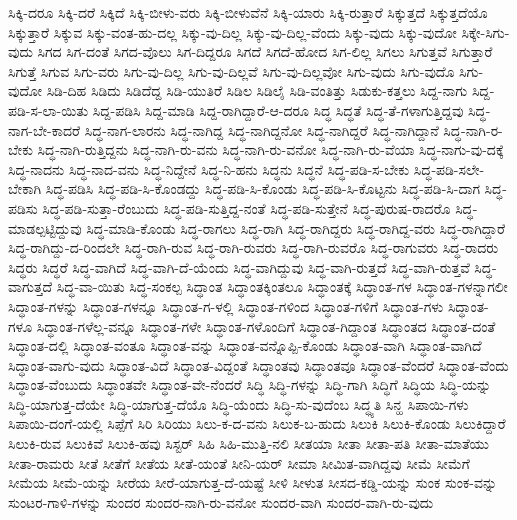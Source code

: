 ಸಿಕ್ಕಿ-ದರೂ
ಸಿಕ್ಕಿ-ದರೆ
ಸಿಕ್ಕಿದೆ
ಸಿಕ್ಕಿ-ಬೀಳು-ವರು
ಸಿಕ್ಕಿ-ಬೀಳುವೆನೆ
ಸಿಕ್ಕಿ-ಯಾರು
ಸಿಕ್ಕಿ-ರುತ್ತಾರೆ
ಸಿಕ್ಕುತ್ತದೆ
ಸಿಕ್ಕುತ್ತದೆಯೊ
ಸಿಕ್ಕುತ್ತಾರೆ
ಸಿಕ್ಕುವ
ಸಿಕ್ಕು-ವಂತ-ಹು-ದಲ್ಲ
ಸಿಕ್ಕು-ವು-ದಿಲ್ಲ
ಸಿಕ್ಕು-ವು-ದಿಲ್ಲ-ವೆಂದು
ಸಿಕ್ಕು-ವುದು
ಸಿಕ್ಕು-ವುದೋ
ಸಿಕ್ಕೇ-ಸಿಗು-ವುದು
ಸಿಗದ
ಸಿಗ-ದಂತೆ
ಸಿಗದ-ವೊಲು
ಸಿಗ-ದಿದ್ದರೂ
ಸಿಗದೆ
ಸಿಗದೆ-ಹೋದ
ಸಿಗ-ಲಿಲ್ಲ
ಸಿಗಲು
ಸಿಗುತ್ತವೆ
ಸಿಗುತ್ತಾರೆ
ಸಿಗುತ್ತೆ
ಸಿಗುವ
ಸಿಗು-ವರು
ಸಿಗು-ವು-ದಿಲ್ಲ
ಸಿಗು-ವು-ದಿಲ್ಲವೆ
ಸಿಗು-ವು-ದಿಲ್ಲವೋ
ಸಿಗು-ವುದು
ಸಿಗು-ವುದೊ
ಸಿಗು-ವುದೋ
ಸಿಡಿ-ದಿಹ
ಸಿಡಿದು
ಸಿಡಿದೆದ್ದ
ಸಿಡಿ-ಯುತಿರೆ
ಸಿಡಿಲ
ಸಿಡಿಲೈ
ಸಿಡಿ-ವಂತಿತ್ತು
ಸಿಡುಕು-ಕತ್ತಲು
ಸಿದ್ದ-ನಾಗು
ಸಿದ್ದ-ಪಡಿ-ಸ-ಲಾ-ಯಿತು
ಸಿದ್ದ-ಪಡಿಸಿ
ಸಿದ್ದ-ಮಾಡಿ
ಸಿದ್ದ-ರಾಗಿದ್ದಾರೆ-ಆ-ದರೂ
ಸಿದ್ಧ
ಸಿದ್ಧತೆ
ಸಿದ್ಧ-ತೆ-ಗಳಾಗುತ್ತಿದ್ದವು
ಸಿದ್ಧ-ನಾಗ-ಬೇ-ಕಾದರೆ
ಸಿದ್ಧ-ನಾಗ-ಲಾರನು
ಸಿದ್ಧ-ನಾಗಿದ್ದ
ಸಿದ್ಧ-ನಾಗಿದ್ದನೋ
ಸಿದ್ಧ-ನಾಗಿದ್ದರೆ
ಸಿದ್ಧ-ನಾಗಿದ್ದಾನೆ
ಸಿದ್ಧ-ನಾಗಿ-ರ-ಬೇಕು
ಸಿದ್ಧ-ನಾಗಿ-ರುತ್ತಿದ್ದನು
ಸಿದ್ಧ-ನಾಗಿ-ರು-ವನು
ಸಿದ್ಧ-ನಾಗಿ-ರು-ವನೋ
ಸಿದ್ಧ-ನಾಗಿ-ರು-ವೆಯಾ
ಸಿದ್ಧ-ನಾಗು-ವು-ದಕ್ಕೆ
ಸಿದ್ಧ-ನಾದನು
ಸಿದ್ಧ-ನಾದ-ವನು
ಸಿದ್ಧ-ನಿದ್ದೇನೆ
ಸಿದ್ಧ-ನಿ-ಹನು
ಸಿದ್ಧನು
ಸಿದ್ಧನೆ
ಸಿದ್ಧ-ಪಡಿ-ಸ-ಬೇಕು
ಸಿದ್ಧ-ಪಡಿ-ಸಲೇ-ಬೇಕಾಗಿ
ಸಿದ್ಧ-ಪಡಿಸಿ
ಸಿದ್ಧ-ಪಡಿ-ಸಿ-ಕೊಂಡದ್ದು
ಸಿದ್ಧ-ಪಡಿ-ಸಿ-ಕೊಂಡು
ಸಿದ್ಧ-ಪಡಿ-ಸಿ-ಕೊಟ್ಟನು
ಸಿದ್ಧ-ಪಡಿ-ಸಿ-ದಾಗ
ಸಿದ್ಧ-ಪಡಿಸು
ಸಿದ್ಧ-ಪಡಿ-ಸುತ್ತಾ-ರೆಂಬುದು
ಸಿದ್ಧ-ಪಡಿ-ಸುತ್ತಿದ್ದ-ನಂತೆ
ಸಿದ್ಧ-ಪಡಿ-ಸುತ್ತೇನೆ
ಸಿದ್ಧ-ಪುರುಷ-ರಾದರೊ
ಸಿದ್ಧ-ಮಾಡಲ್ಪಟ್ಟಿದ್ದುವು
ಸಿದ್ಧ-ಮಾಡಿ-ಕೊಂಡು
ಸಿದ್ಧ-ರಾಗಲು
ಸಿದ್ಧ-ರಾಗಿ
ಸಿದ್ಧ-ರಾಗಿದ್ದರು
ಸಿದ್ಧ-ರಾಗಿದ್ದ-ವರು
ಸಿದ್ಧ-ರಾಗಿದ್ದಾರೆ
ಸಿದ್ಧ-ರಾಗಿದ್ದು-ದ-ರಿಂದಲೇ
ಸಿದ್ಧ-ರಾಗಿ-ರುವ
ಸಿದ್ಧ-ರಾಗಿ-ರುವರು
ಸಿದ್ಧ-ರಾಗಿ-ರುವರೊ
ಸಿದ್ಧ-ರಾಗುವರು
ಸಿದ್ಧ-ರಾದರು
ಸಿದ್ಧರು
ಸಿದ್ಧರೆ
ಸಿದ್ಧ-ವಾಗಿದೆ
ಸಿದ್ಧ-ವಾಗಿ-ದೆ-ಯೆಂದು
ಸಿದ್ಧ-ವಾಗಿದ್ದುವು
ಸಿದ್ಧ-ವಾಗಿ-ರುತ್ತದೆ
ಸಿದ್ಧ-ವಾಗಿ-ರುತ್ತವೆ
ಸಿದ್ಧ-ವಾಗುತ್ತದೆ
ಸಿದ್ಧ-ವಾ-ಯಿತು
ಸಿದ್ಧ-ಸಂಕಲ್ಪ
ಸಿದ್ಧಾಂತ
ಸಿದ್ಧಾಂತಕ್ಕಿಂತಲೂ
ಸಿದ್ಧಾಂತಕ್ಕೆ
ಸಿದ್ಧಾಂತ-ಗಳ
ಸಿದ್ಧಾಂತ-ಗಳನ್ನಾಗಲೀ
ಸಿದ್ಧಾಂತ-ಗಳನ್ನು
ಸಿದ್ಧಾಂತ-ಗಳನ್ನೂ
ಸಿದ್ಧಾಂತ-ಗ-ಳಲ್ಲಿ
ಸಿದ್ಧಾಂತ-ಗಳಿಂದ
ಸಿದ್ಧಾಂತ-ಗಳಿಗೆ
ಸಿದ್ಧಾಂತ-ಗಳು
ಸಿದ್ಧಾಂತ-ಗಳೂ
ಸಿದ್ಧಾಂತ-ಗಳೆಲ್ಲ-ವನ್ನೂ
ಸಿದ್ಧಾಂತ-ಗಳೇ
ಸಿದ್ಧಾಂತ-ಗಳೊಂದಿಗೆ
ಸಿದ್ಧಾಂತ-ಗಿದ್ದಾಂತ
ಸಿದ್ಧಾಂತದ
ಸಿದ್ಧಾಂತ-ದಂತೆ
ಸಿದ್ಧಾಂತ-ದಲ್ಲಿ
ಸಿದ್ಧಾಂತ-ವಂತೂ
ಸಿದ್ಧಾಂತ-ವನ್ನು
ಸಿದ್ಧಾಂತ-ವನ್ನೊಪ್ಪಿ-ಕೊಂಡು
ಸಿದ್ಧಾಂತ-ವಾಗಿ
ಸಿದ್ಧಾಂತ-ವಾಗಿದೆ
ಸಿದ್ಧಾಂತ-ವಾಗು-ವುದು
ಸಿದ್ಧಾಂತ-ವಿದೆ
ಸಿದ್ಧಾಂತ-ವಿದ್ದಂತೆ
ಸಿದ್ಧಾಂತವು
ಸಿದ್ಧಾಂತವೂ
ಸಿದ್ಧಾಂತ-ವೆಂದರೆ
ಸಿದ್ಧಾಂತ-ವೆಂದು
ಸಿದ್ಧಾಂತ-ವೆಂಬುದು
ಸಿದ್ಧಾಂತವೇ
ಸಿದ್ಧಾಂತ-ವೇ-ನೆಂದರೆ
ಸಿದ್ಧಿ
ಸಿದ್ಧಿ-ಗಳನ್ನು
ಸಿದ್ಧಿ-ಗಾಗಿ
ಸಿದ್ಧಿಗೆ
ಸಿದ್ಧಿಯ
ಸಿದ್ಧಿ-ಯನ್ನು
ಸಿದ್ಧಿ-ಯಾಗುತ್ತ-ದೆಯೇ
ಸಿದ್ಧಿ-ಯಾಗುತ್ತ-ದೆಯೊ
ಸಿದ್ಧಿ-ಯೆಂದು
ಸಿದ್ಧಿ-ಸು-ವುದೆಂಬ
ಸಿದ್ಧ್ಯತಿ
ಸಿನ್ಹ
ಸಿಪಾಯಿ-ಗಳು
ಸಿಪಾಯಿ-ದಂಗೆ-ಯಲ್ಲಿ
ಸಿಪ್ಪೆಗೆ
ಸಿರಿ
ಸಿರಿಯು
ಸಿಲು-ಕ-ದ-ವನು
ಸಿಲುಕ-ಬ-ಹುದು
ಸಿಲುಕಿ
ಸಿಲುಕಿ-ಕೊಂಡು
ಸಿಲುಕಿದ್ದಾರೆ
ಸಿಲುಕಿ-ರುವ
ಸಿಲುಕಿವೆ
ಸಿಲುಕಿ-ಹವು
ಸಿಸ್ಟರ್
ಸಿಹಿ
ಸಿಹಿ-ಮುತ್ತಿ-ನಲಿ
ಸೀತಯಾ
ಸೀತಾ
ಸೀತಾ-ಪತಿ
ಸೀತಾ-ಮಾತೆಯು
ಸೀತಾ-ರಾಮರು
ಸೀತೆ
ಸೀತೆಗೆ
ಸೀತೆಯ
ಸೀತೆ-ಯಂತೆ
ಸೀನಿ-ಯರ್
ಸೀಮಾ
ಸೀಮಿತ-ವಾಗಿದ್ದವು
ಸೀಮೆ
ಸೀಮೆಗೆ
ಸೀಮೆಯ
ಸೀಮೆ-ಯನ್ನು
ಸೀರೆಯ
ಸೀರೆ-ಯಾಗುತ್ತ-ದೆ-ಯಷ್ಟೆ
ಸೀಳಿ
ಸೀಳುತ
ಸೀಸದ-ಕಡ್ಡಿ-ಯನ್ನು
ಸುಂಕ
ಸುಂಕ-ವನ್ನು
ಸುಂಟರ-ಗಾಳಿ-ಗಳನ್ನು
ಸುಂದರ
ಸುಂದರ-ನಾಗಿ-ರು-ವನೋ
ಸುಂದರ-ವಾಗಿ
ಸುಂದರ-ವಾಗಿ-ರು-ವುದು
